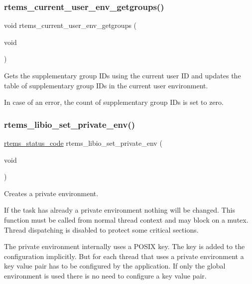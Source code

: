 \subsubsection{\texorpdfstring{rtems\_current\_user\_env\_getgroups()}{rtems\_current\_user\_env\_getgroups()}}
{\footnotesize\ttfamily void rtems\+\_\+current\+\_\+user\+\_\+env\+\_\+getgroups (\begin{DoxyParamCaption}\item[{void}]{ }\end{DoxyParamCaption})}



Gets the supplementary group I\+Ds using the current user ID and updates the table of supplementary group I\+Ds in the current user environment. 

In case of an error, the count of supplementary group I\+Ds is set to zero. \mbox{\label{group__LibIOEnv_ga2026f741b68624a75d0cfc1957f75f62}} 
\subsubsection{\texorpdfstring{rtems\_libio\_set\_private\_env()}{rtems\_libio\_set\_private\_env()}}
{\footnotesize\ttfamily \mbox{\hyperlink{group__ClassicStatus_ga545d41846817eaba6143d52ee4d9e9fe}{rtems\+\_\+status\+\_\+code}} rtems\+\_\+libio\+\_\+set\+\_\+private\+\_\+env (\begin{DoxyParamCaption}\item[{void}]{ }\end{DoxyParamCaption})}



Creates a private environment. 

If the task has already a private environment nothing will be changed. This function must be called from normal thread context and may block on a mutex. Thread dispatching is disabled to protect some critical sections.

The private environment internally uses a P\+O\+S\+IX key. The key is added to the configuration implicitly. But for each thread that uses a private environment a key value pair has to be configured by the application. If only the global environment is used there is no need to configure a key value pair.


